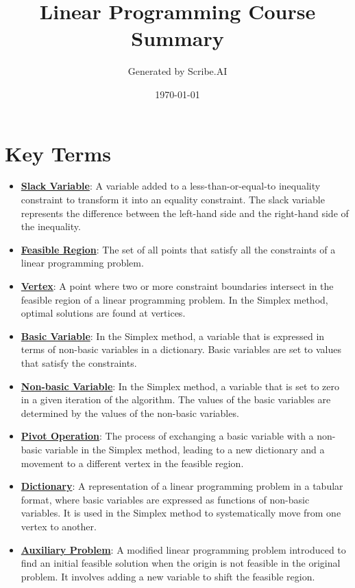 \documentclass{article}%
\title{Linear Programming Course Summary}%
\author{Generated by Scribe.AI}%
\date{\today}%
\begin{document}
%
\normalsize%
\maketitle%
\section{Key Terms}%
\label{sec:KeyTerms}%
\begin{itemize}[leftmargin=*]%
\item \href{https://www.math.purdue.edu/~yipn/421/2024-08-27-ExSimplex.pdf#page=1}{\textbf{Slack Variable}}: A variable added to a less-than-or-equal-to inequality constraint to transform it into an equality constraint.  The slack variable represents the difference between the left-hand side and the right-hand side of the inequality.%
\item \href{https://www.math.purdue.edu/~yipn/421/2024-08-27-ExSimplex.pdf#page=4}{\textbf{Feasible Region}}: The set of all points that satisfy all the constraints of a linear programming problem.%
\item \href{https://www.math.purdue.edu/~yipn/421/2024-08-27-ExSimplex.pdf#page=5}{\textbf{Vertex}}: A point where two or more constraint boundaries intersect in the feasible region of a linear programming problem.  In the Simplex method, optimal solutions are found at vertices.%
\item \href{https://www.math.purdue.edu/~yipn/421/2024-08-27-ExSimplex.pdf#page=6}{\textbf{Basic Variable}}: In the Simplex method, a variable that is expressed in terms of non-basic variables in a dictionary.  Basic variables are set to values that satisfy the constraints.%
\item \href{https://www.math.purdue.edu/~yipn/421/2024-08-27-ExSimplex.pdf#page=6}{\textbf{Non{-}basic Variable}}: In the Simplex method, a variable that is set to zero in a given iteration of the algorithm.  The values of the basic variables are determined by the values of the non-basic variables.%
\item \href{https://www.math.purdue.edu/~yipn/421/2024-08-27-ExSimplex.pdf#page=9}{\textbf{Pivot Operation}}: The process of exchanging a basic variable with a non-basic variable in the Simplex method, leading to a new dictionary and a movement to a different vertex in the feasible region.%
\item \href{https://www.math.purdue.edu/~yipn/421/2024-08-27-ExSimplex.pdf#page=26}{\textbf{Dictionary}}: A representation of a linear programming problem in a tabular format, where basic variables are expressed as functions of non-basic variables.  It is used in the Simplex method to systematically move from one vertex to another.%
\item \href{https://www.math.purdue.edu/~yipn/421/2024-08-27-ExSimplex.pdf#page=32}{\textbf{Auxiliary Problem}}: A modified linear programming problem introduced to find an initial feasible solution when the origin is not feasible in the original problem.  It involves adding a new variable to shift the feasible region.%
\end{itemize}
\end{document}
